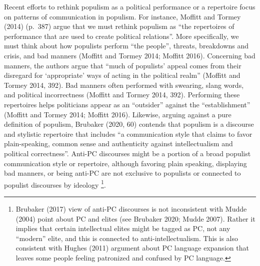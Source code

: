 \documentclass[smallextended]{svjour3}       %
\begin{document}
Recent efforts to rethink populism as a political performance or a
repertoire focus on patterns of communication in populism. For instance,
Moffitt and Tormey (2014) (p.~387) argue that we must rethink populism
as ``the repertoires of performance that are used to create political
relations''. More specifically, we must think about how populists
perform ``the people'', threats, breakdowns and crisis, and bad manners
(Moffitt and Tormey 2014; Moffitt 2016). Concerning bad manners, the
authors argue that ``much of populists' appeal comes from their
disregard for `appropriate' ways of acting in the political realm''
(Moffitt and Tormey 2014, 392). Bad manners often performed with
swearing, slang words, and political incorrectness (Moffitt and Tormey
2014, 392). Performing these repertoires helps politicians appear as an
``outsider'' against the ``establishment'' (Moffitt and Tormey 2014;
Moffitt 2016). Likewise, arguing against a pure definition of populism,
Brubaker (2020, 60) contends that populism is a discourse and stylistic
repertoire that includes ``a communication style that claims to favor
plain-speaking, common sense and authenticity against intellectualism
and political correctness''. Anti-PC discourses might be a portion of a
broad populist communication style or repertoire, although favoring
plain speaking, displaying bad manners, or being anti-PC are not
exclusive to populists or connected to populist discourses by ideology
\footnote{ Brubaker (2017) view of anti-PC discourses is not
  inconsistent with Mudde (2004) point about PC and elites (see Brubaker
  2020; Mudde 2007). Rather it implies that certain intellectual elites
  might be tagged as PC, not any ``modern'' elite, and this is connected
  to anti-intellectualism. This is also consistent with Hughes (2011)
  argument about PC language expansion that leaves some people feeling
  patronized and confused by PC language.}.
\end{document}
